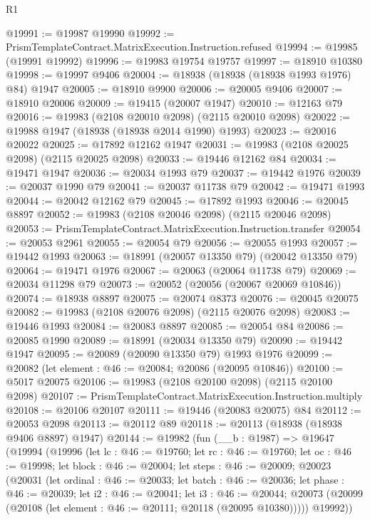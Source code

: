 \begin{lexlean}{R1}
\begin{coremodule}
@19991 := @19987 @19990
@19992 := PrismTemplateContract.MatrixExecution.Instruction.refused
@19994 := @19985 (@19991 @19992)
@19996 := @19983 @19754 @19757
@19997 := @18910 @10380
@19998 := @19997 @9406
@20004 := @18938 (@18938 (@18938 @1993 @1976) @84) @1947
@20005 := @18910 @9900
@20006 := @20005 @9406
@20007 := @18910 @20006
@20009 := @19415 (@20007 @1947)
@20010 := @12163 @79
@20016 := @19983 (@2108 @20010 @2098) (@2115 @20010 @2098)
@20022 := @19988 @1947 (@18938 (@18938 @2014 @1990) @1993)
@20023 := @20016 @20022
@20025 := @17892 @12162 @1947
@20031 := @19983 (@2108 @20025 @2098) (@2115 @20025 @2098)
@20033 := @19446 @12162 @84
@20034 := @19471 @1947
@20036 := @20034 @1993 @79
@20037 := @19442 @1976
@20039 := @20037 @1990 @79
@20041 := @20037 @11738 @79
@20042 := @19471 @1993
@20044 := @20042 @12162 @79
@20045 := @17892 @1993
@20046 := @20045 @8897
@20052 := @19983 (@2108 @20046 @2098) (@2115 @20046 @2098)
@20053 := PrismTemplateContract.MatrixExecution.Instruction.transfer
@20054 := @20053 @2961
@20055 := @20054 @79
@20056 := @20055 @1993
@20057 := @19442 @1993
@20063 := @18991 (@20057 @13350 @79) (@20042 @13350 @79)
@20064 := @19471 @1976
@20067 := @20063 (@20064 @11738 @79)
@20069 := @20034 @11298 @79
@20073 := @20052 (@20056 (@20067 @20069 @10846))
@20074 := @18938 @8897
@20075 := @20074 @8373
@20076 := @20045 @20075
@20082 := @19983 (@2108 @20076 @2098) (@2115 @20076 @2098)
@20083 := @19446 @1993
@20084 := @20083 @8897
@20085 := @20054 @84
@20086 := @20085 @1990
@20089 := @18991 (@20034 @13350 @79)
@20090 := @19442 @1947
@20095 := @20089 (@20090 @13350 @79) @1993 @1976
@20099 := @20082 (let element : @46 := @20084; @20086 (@20095 @10846))
@20100 := @5017 @20075
@20106 := @19983 (@2108 @20100 @2098) (@2115 @20100 @2098)
@20107 := PrismTemplateContract.MatrixExecution.Instruction.multiply
@20108 := @20106 @20107
@20111 := @19446 (@20083 @20075) @84
@20112 := @20053 @2098
@20113 := @20112 @89
@20118 := @20113 (@18938 (@18938 @9406 @8897) @1947)
@20144 := @19982
    (fun (__b : @1987) =>
    @19647
      (@19994
        (@19996
          (let lc : @46 := @19760;
          let rc : @46 := @19760;
          let oc : @46 := @19998;
          let block : @46 := @20004;
          let steps : @46 := @20009;
          @20023
            (@20031
              (let ordinal : @46 := @20033;
              let batch : @46 := @20036;
              let phase : @46 := @20039;
              let i2 : @46 := @20041;
              let i3 : @46 := @20044;
              @20073 (@20099 (@20108 (let element : @46 := @20111; @20118 (@20095 @10380)))))
              @19992))

\end{coremodule}
\end{lexlean}
